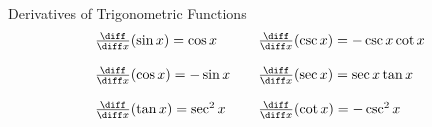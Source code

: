 \begin{frame}
Derivatives of Trigonometric Functions
\[
\begin{array}{l@{\qquad}l}
\frac{\diff}{\diff x}(\sin x) = \cos x & %
\frac{\diff}{\diff x}(\csc x) = -\csc x\cot x \\ %
& \\
\frac{\diff}{\diff x}(\cos x) = -\sin x & %
\frac{\diff}{\diff x}(\sec x) = \sec x\tan x \\ %
& \\
\frac{\diff}{\diff x}(\tan x) = \sec^2 x & %
\frac{\diff}{\diff x}(\cot x) = -\csc^2 x \\ %
\end{array}
\]
\end{frame}
